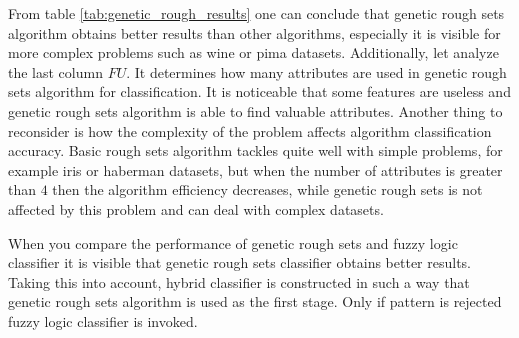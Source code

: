 From table \ref{tab:genetic_rough_results} one can conclude that genetic rough
sets algorithm obtains better results than other algorithms, especially it is
visible for more complex problems such as wine or pima datasets. Additionally,
let analyze the last column $FU$. It determines how many attributes are used in
genetic rough sets algorithm for classification. It is noticeable that some
features are useless and genetic rough sets algorithm is able to find
valuable attributes. Another thing to reconsider is how the complexity of the
problem affects algorithm classification accuracy. Basic rough sets algorithm
tackles quite well with simple problems, for example iris or haberman datasets,
but when the number of attributes is greater than $4$ then the algorithm efficiency
decreases, while genetic rough sets is not affected by this problem and can
deal with complex datasets.

When you compare the performance of genetic rough sets and fuzzy logic
classifier it is visible that genetic rough sets classifier obtains better
results. Taking this into account, hybrid classifier is constructed in such a
way that genetic rough sets algorithm is used as the first stage. Only if
pattern is rejected fuzzy logic classifier is invoked.


